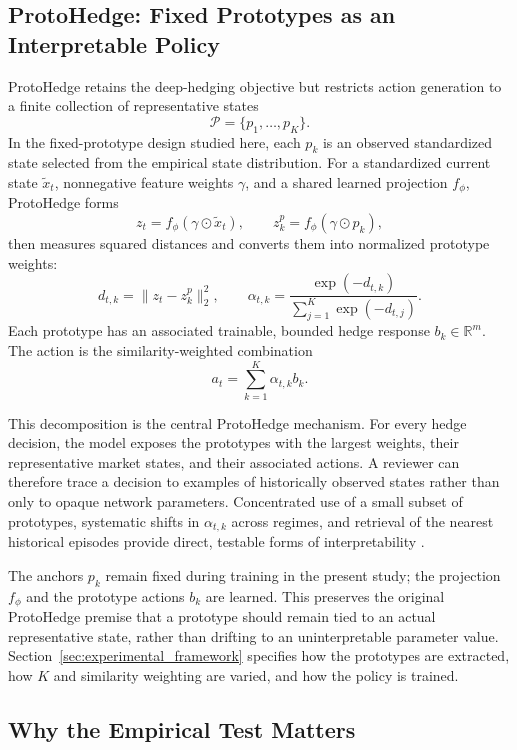 \documentclass[sigconf]{acmart}
\begin{document}
\subsection{ProtoHedge: Fixed Prototypes as an Interpretable Policy}
\label{subsec:protohedge_background}

ProtoHedge retains the deep-hedging objective but restricts action generation
to a finite collection of representative states
\[
\mathcal{P}=\{p_1,\ldots,p_K\}.
\]
In the fixed-prototype design studied here, each $p_k$ is an observed
standardized state selected from the empirical state distribution. For a
standardized current state $\tilde{x}_t$, nonnegative feature weights
$\gamma$, and a shared learned projection $f_\phi$, ProtoHedge forms
\[
z_t=f_\phi(\gamma\odot\tilde{x}_t), \qquad
z_k^{p}=f_\phi(\gamma\odot p_k),
\]
then measures squared distances and converts them into normalized prototype
weights:
\[
d_{t,k}=\lVert z_t-z_k^{p}\rVert_2^2,
\qquad
\alpha_{t,k}
=
\frac{\exp(-d_{t,k})}
{\sum_{j=1}^{K}\exp(-d_{t,j})}.
\]
Each prototype has an associated trainable, bounded hedge response
$b_k\in\mathbb{R}^{m}$. The action is the similarity-weighted combination
\[
a_t=\sum_{k=1}^{K}\alpha_{t,k}b_k.
\]

This decomposition is the central ProtoHedge mechanism. For every hedge
decision, the model exposes the prototypes with the largest weights, their
representative market states, and their associated actions. A reviewer can
therefore trace a decision to examples of historically observed states rather
than only to opaque network parameters. Concentrated use of a small subset of
prototypes, systematic shifts in $\alpha_{t,k}$ across regimes, and retrieval
of the nearest historical episodes provide direct, testable forms of
interpretability \cite{faloughi2025protohedge}.

The anchors $p_k$ remain fixed during training in the present study; the
projection $f_\phi$ and the prototype actions $b_k$ are learned. This
preserves the original ProtoHedge premise that a prototype should remain tied
to an actual representative state, rather than drifting to an uninterpretable
parameter value. Section~\ref{sec:experimental_framework} specifies how the
prototypes are extracted, how $K$ and similarity weighting are varied, and how
the policy is trained.

\subsection{Why the Empirical Test Matters}
\label{subsec:empirical_gap}
\end{document}
